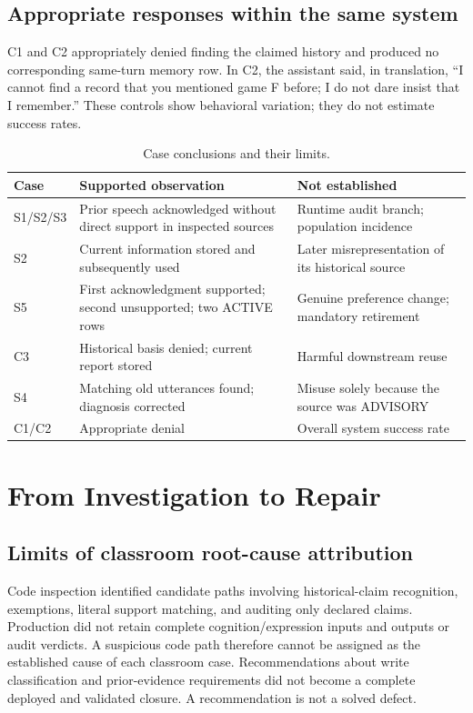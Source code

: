 \documentclass[11pt,a4paper]{article}
\begin{document}
\subsection{Appropriate responses within the same system}
C1 and C2 appropriately denied finding the claimed history and produced no corresponding same-turn memory row. In C2, the assistant said, in translation, ``I cannot find a record that you mentioned game F before; I do not dare insist that I remember.'' These controls show behavioral variation; they do not estimate success rates.

\begin{table}[htbp]
\centering\small
\caption{Case conclusions and their limits.}\label{tab:cases}
\begin{tabular}{P{.12\linewidth}P{.39\linewidth}P{.39\linewidth}}
\toprule
Case & Supported observation & Not established \\
\midrule
S1/S2/S3 & Prior speech acknowledged without direct support in inspected sources & Runtime audit branch; population incidence \\
S2 & Current information stored and subsequently used & Later misrepresentation of its historical source \\
S5 & First acknowledgment supported; second unsupported; two ACTIVE rows & Genuine preference change; mandatory retirement \\
C3 & Historical basis denied; current report stored & Harmful downstream reuse \\
S4 & Matching old utterances found; diagnosis corrected & Misuse solely because the source was ADVISORY \\
C1/C2 & Appropriate denial & Overall system success rate \\
\bottomrule
\end{tabular}
\end{table}

\section{From Investigation to Repair}
\subsection{Limits of classroom root-cause attribution}
Code inspection identified candidate paths involving historical-claim recognition, exemptions, literal support matching, and auditing only declared claims. Production did not retain complete cognition/expression inputs and outputs or audit verdicts. A suspicious code path therefore cannot be assigned as the established cause of each classroom case. Recommendations about write classification and prior-evidence requirements did not become a complete deployed and validated closure. A recommendation is not a solved defect.
\end{document}
